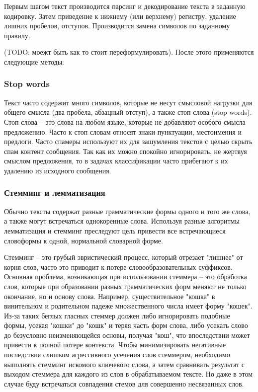 \documentclass[12pt]{article}
\begin{document}
Первым шагом текст производится парсинг и декодирование текста в заданную кодировку. Затем приведение к нижнему (или верхнему) регистру, удаление лишних пробелов, отступов. Производится замена символов по заданному правилу.

(TODO: моежт быть как то стоит переформулировать).
После этого применяются следующие методы:


\subsubsection*{Stop words}
Текст часто содержит много символов, которые не несут смысловой нагрузки для общего смысла (два пробела, абзацный отступ), а также стоп слова (stop words).
Стоп слова -- это слова на любом языке, которые не добавляют особого смысла предложению. 	Часто к стоп словам относят знаки пунктуации, местоимения и предлоги. Часто спамеры используют их для зашумления текстов с целью скрыть спам контент сообщения. Так как их можно спокойно игнорировать, не жертвуя смыслом предложения, то в задачах классификации часто прибегают к их удалению из исходного сообщения.

\subsubsection*{Стемминг и лемматизация}
Обычно тексты содержат разные грамматические формы одного и того же слова, а также могут встречаться однокоренные слова. Используя разные алгоритмы лемматизация и стемминг преследуют цель привести все встречающиеся словоформы к одной, нормальной словарной форме.


Стемминг -- это грубый эвристический процесс, который отрезает "лишнее" от корня слов, часто это приводит к потере словообразовательных суффиксов. Основная проблема, возникающая при использовании стеммера -- это обработка слов, которые при образовании разных грамматических форм меняют не только окончание, но и основу слова. Например, существительное "кошка" в винительном и родительном падеже множественного числа имеет форму "кошек". Из-за таких беглых гласных стеммер должен либо игнорировать подобные формы, усекая "кошки" до "кошк" и теряя часть форм слова, либо усекать слово до безусловно неизменяющейся основы, получая "кош", что впоследствии может привести к полной потере контекста. Чтобы минимизировать негативные последствия слишком агрессивного усечения слов стеммером, необходимо выполнять стемминг искомого ключевого слова, а затем сравнивать результат с выходом стеммера для каждого из слов в обрабатываемом тексте. Но даже в этом случае буду встречаться совпадения стемов для совершенно несвязанных слов.
\end{document}

